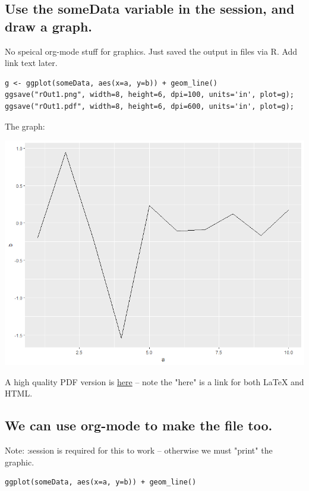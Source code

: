\documentclass[11pt]{article}
\begin{document}
\subsection{Use the someData variable in the session, and draw a graph.}
\label{sec:org7dc2771}

No speical org-mode stuff for graphics.  Just saved the output in files via R.  Add link text later.

\begin{verbatim}
g <- ggplot(someData, aes(x=a, y=b)) + geom_line()
ggsave("rOut1.png", width=8, height=6, dpi=100, units='in', plot=g);
ggsave("rOut1.pdf", width=8, height=6, dpi=600, units='in', plot=g);
\end{verbatim}

The graph:

\begin{center}
\includegraphics[width=.9\linewidth]{rOut1.png}
\end{center}

A high quality PDF version is \href{rOut1.pdf}{here} -- note the "here" is a link for both \LaTeX{} and HTML.

\subsection{We can use org-mode to make the file too.}
\label{sec:org51b49a9}

Note: :session is required for this to work -- otherwise we must "print" the graphic.

\begin{verbatim}
ggplot(someData, aes(x=a, y=b)) + geom_line()
\end{verbatim}
\end{document}

